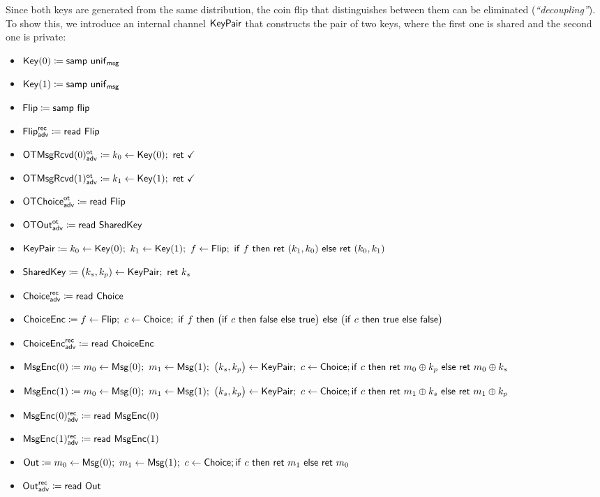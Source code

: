 \noindent Since both keys are generated from the same distribution, the coin flip that distinguishes between them can be eliminated (\emph{``decoupling''}). To show this, we introduce an internal channel $\mathsf{KeyPair}$ that constructs the pair of two keys, where the first one is shared and the second one is private:

\begin{itemize}
\item $\mathsf{Key}(0) \coloneqq \mathsf{samp} \ \mathsf{unif}_{\mathsf{msg}}$
\item $\mathsf{Key}(1) \coloneqq \mathsf{samp} \ \mathsf{unif}_{\mathsf{msg}}$
\item $\mathsf{Flip} \coloneqq \mathsf{samp} \ \mathsf{flip}$
\item {\color{blue} $\mathsf{Flip}^{\mathsf{rec}}_{\mathsf{adv}} \coloneqq \mathsf{read} \ \mathsf{Flip}$}
\item {\color{blue} $\LeakOTMsgRcvd(0)^\ot_\adv \coloneqq k_0 \leftarrow \Key(0); \ \ret{\checkmark}$}
\item {\color{blue} $\LeakOTMsgRcvd(1)^\ot_\adv \coloneqq k_1 \leftarrow \Key(1); \ \ret{\checkmark}$}
\item {\color{blue} $\mathsf{OTChoice}^{\mathsf{ot}}_{\mathsf{adv}} \coloneqq \mathsf{read} \ \mathsf{Flip}$}
\item {\color{blue} $\mathsf{OTOut}^{\mathsf{ot}}_{\mathsf{adv}} \coloneqq \mathsf{read} \ \mathsf{SharedKey}$}
\item {\color{red} $\KeyPair \coloneqq k_0 \leftarrow \Key(0); \ k_1 \leftarrow \Key(1); \ f \leftarrow \Flip; \ \ifte{f}{\ret{(k_1,k_0)}}{\ret{(k_0,k_1)}}$}
\item {\color{red} $\mathsf{SharedKey} \coloneqq \big(k_s,k_p) \leftarrow \mathsf{KeyPair}; \ \mathsf{ret} \ k_s$}
\item {\color{blue} $\mathsf{Choice}^{\mathsf{rec}}_{\mathsf{adv}} \coloneqq \mathsf{read} \ \mathsf{Choice}$}
\item $\ChoiceEnc \coloneqq f \leftarrow \Flip; \ c \leftarrow \Choice; \ \ifte{f}{\big(\ifte{c}{\false}{\true}\big)}{\big(\ifte{c}{\true}{\false}\big)}$
\item {\color{blue} $\mathsf{ChoiceEnc}^{\mathsf{rec}}_{\mathsf{adv}} \coloneqq \mathsf{read} \ \mathsf{ChoiceEnc}$}
\item {\color{red} $\mathsf{MsgEnc}(0) \coloneqq m_0 \leftarrow \mathsf{Msg}(0); \ m_1 \leftarrow \mathsf{Msg}(1); \ \big(k_s,k_p\big) \leftarrow \mathsf{KeyPair}; \ c \leftarrow \mathsf{Choice}; \\ \mathsf{if} \ c \ \mathsf{then} \ \mathsf{ret} \ m_0 \oplus k_p \ \mathsf{else} \ \mathsf{ret} \ m_0 \oplus k_s$}
\item {\color{red} $\mathsf{MsgEnc}(1) \coloneqq m_0 \leftarrow \mathsf{Msg}(0); \ m_1 \leftarrow \mathsf{Msg}(1); \ \big(k_s,k_p\big) \leftarrow \mathsf{KeyPair}; \ c \leftarrow \mathsf{Choice}; \\ \mathsf{if} \ c \ \mathsf{then} \ \mathsf{ret} \ m_1 \oplus k_s \ \mathsf{else} \ \mathsf{ret} \ m_1 \oplus k_p$}
\item {\color{blue} $\mathsf{MsgEnc}(0)^{\mathsf{rec}}_{\mathsf{adv}} \coloneqq \mathsf{read} \ \mathsf{MsgEnc}(0)$}
\item {\color{blue} $\mathsf{MsgEnc}(1)^{\mathsf{rec}}_{\mathsf{adv}} \coloneqq \mathsf{read} \ \mathsf{MsgEnc}(1)$}
\item $\mathsf{Out} \coloneqq m_0 \leftarrow \mathsf{Msg}(0); \ m_1 \leftarrow \mathsf{Msg}(1); \ c \leftarrow \mathsf{Choice}; \\ \mathsf{if} \ c \ \mathsf{then} \ \mathsf{ret} \ m_1 \ \mathsf{else} \ \mathsf{ret} \ m_0$
\item {\color{blue} $\mathsf{Out}^{\mathsf{rec}}_{\mathsf{adv}} \coloneqq \mathsf{read} \ \mathsf{Out}$}
\end{itemize}

